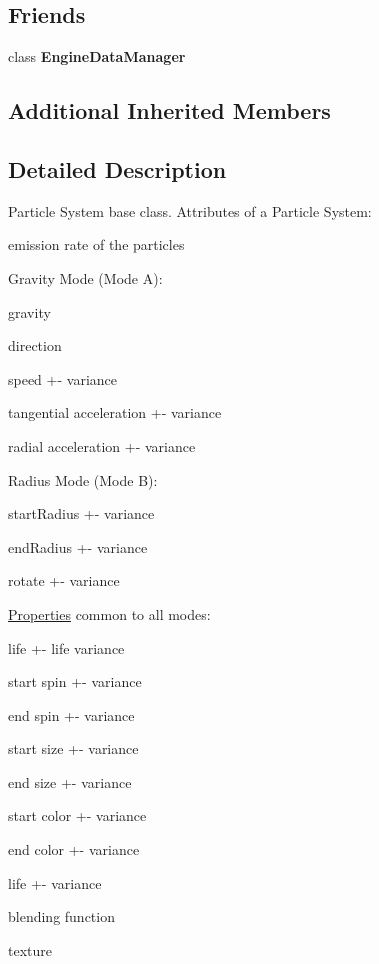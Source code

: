 \subsection*{Friends}
\begin{DoxyCompactItemize}
\item 
\mbox{\label{classParticleSystem_a88ff248bfa4508ce80a02f6b943844e5}} 
class {\bfseries Engine\+Data\+Manager}
\end{DoxyCompactItemize}
\subsection*{Additional Inherited Members}


\subsection{Detailed Description}
Particle System base class. Attributes of a Particle System\+: 


\begin{DoxyItemize}
\item emission rate of the particles
\item Gravity Mode (Mode A)\+:
\item gravity
\item direction
\item speed +-\/ variance
\item tangential acceleration +-\/ variance
\item radial acceleration +-\/ variance
\item Radius Mode (Mode B)\+:
\item start\+Radius +-\/ variance
\item end\+Radius +-\/ variance
\item rotate +-\/ variance
\item \hyperlink{classProperties}{Properties} common to all modes\+:
\item life +-\/ life variance
\item start spin +-\/ variance
\item end spin +-\/ variance
\item start size +-\/ variance
\item end size +-\/ variance
\item start color +-\/ variance
\item end color +-\/ variance
\item life +-\/ variance
\item blending function
\item texture
\end{DoxyItemize}

